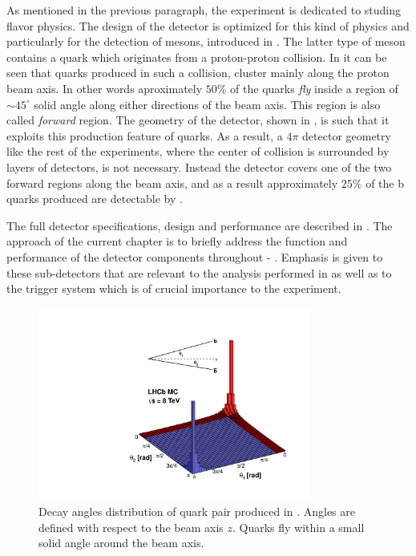 As mentioned in the previous paragraph, the \lhcb experiment is dedicated to studing flavor physics.
The design of the detector is optimized for this kind of physics and particularly for the detection
of \B mesons, introduced in . The latter type of meson contains a \bquark quark
which originates from a proton-proton collision. In  it can be seen
that \bquark quarks produced in such a collision, cluster mainly along the proton beam axis. In other words
aproximately $50\%$ of the \bquark quarks {\it fly} inside a region of $\sim 45^\circ$ solid angle along either
directions of the beam axis. This region is also called {\it forward} region. The geometry of the \lhcb detector,
shown in , is such that it exploits this production feature of \bquark quarks.
As a result, a $4\pi$ detector geometry like the rest of the \lhc experiments, where the center of collision is surrounded
by layers of detectors, is not necessary. Instead the \lhcb detector covers one of the two forward regions
along the beam axis, and as a result approximately $25\%$ of the b quarks produced are detectable by \lhcb.

The full \lhcb detector specifications, design and performance are described in \cite{Aaij:2014jba}.
The approach of the current chapter is to briefly address the function and performance of the detector components
throughout  - . Emphasis is given to these sub-detectors that are relevant
to the analysis performed in  as well as to the trigger system which is of crucial importance
to the \lhcb experiment.

\begin{figure}[t]
  \centering
  \includegraphics[width=0.8\textwidth, trim=0cm 0cm 0cm 2.5cm, clip=true]{Figures/Chapter2/08_rad_acc_scheme_right}
  \caption{Decay angles distribution of \bquark quark pair produced in \lhcb. Angles are defined with
           respect to the beam axis $z$. Quarks fly within a small solid angle around the beam axis.}
  \label{bb_roduction_angles}
\end{figure}

